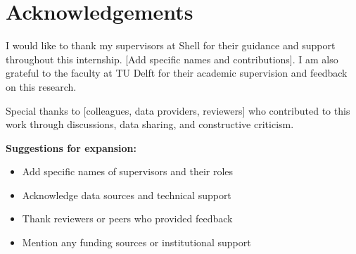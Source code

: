 \documentclass[10.5pt]{article}
\begin{document}
\section*{Acknowledgements}

I would like to thank my supervisors at Shell for their guidance and support throughout this internship. [Add specific names and contributions]. I am also grateful to the faculty at TU Delft for their academic supervision and feedback on this research.

Special thanks to [colleagues, data providers, reviewers] who contributed to this work through discussions, data sharing, and constructive criticism.

\textbf{Suggestions for expansion:}
\begin{itemize}
    \item Add specific names of supervisors and their roles
    \item Acknowledge data sources and technical support
    \item Thank reviewers or peers who provided feedback
    \item Mention any funding sources or institutional support
\end{itemize}

\newpage



\end{document}
